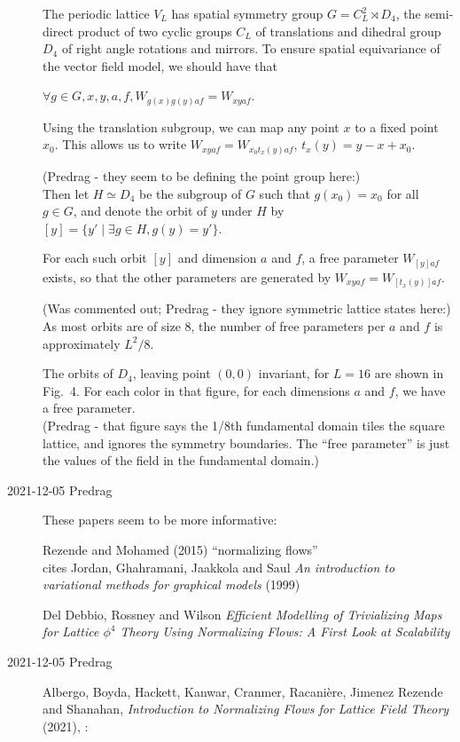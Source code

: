 \begin{description}
The periodic lattice $V_L$ has spatial symmetry group $G=C_L^2 \rtimes
D_4$, the semi-direct product of two cyclic groups $C_L$ of translations
and dihedral group $D_4$ of right angle rotations and mirrors.
To ensure spatial equivariance of the vector field model, we should have
that

$\forall g \in G, x,y,a, f, W_{g(x)g(y)af}=W_{xyaf}$.

Using the translation subgroup, we can map any point $x$ to a fixed point
$x_0$. This allows us to write $W_{xyaf}=W_{x_0t_x(y)af}$, $t_x(y) = y -
x + x_0$.

(Predrag - they seem to be defining the point group here:)\\
Then let $H\simeq D_4$ be the subgroup of $G$ such that $g(x_0)=x_0$ for
all $g\in G$, and denote the orbit of $y$ under $H$ by $[y]=\{y' \mid
\exists g \in H, g(y)=y'\}$.

For each such orbit $[y]$ and dimension $a$
and $f$, a free parameter $W_{[y]af}$ exists, so that the other
parameters are generated by $W_{xyaf}=W_{[t_x(y)]af}$.


(Was commented out; Predrag - they ignore symmetric lattice states here:)\\
As most orbits are of size 8, the number of free parameters per $a$ and
$f$ is approximately $L^2/8$.

The orbits of $D_4$, leaving point $(0, 0)$ invariant, for $L=16$ are
shown in Fig.~4. %
For each color in that figure, for each
dimensions $a$ and $f$, we have a free parameter.\\
(Predrag - that figure says the 1/8th fundamental domain tiles
the square lattice, and ignores the symmetry boundaries. The ``free parameter''
is just the values of the field in the fundamental domain.)


\item[2021-12-05 Predrag]
These papers seem to be more informative:

Rezende and Mohamed  (2015) ``normalizing flows''
\\
cites   Jordan,  Ghahramani,  Jaakkola  and Saul
{\em An introduction to variational methods for graphical models} (1999)

Del Debbio, Rossney and Wilson {\em Efficient Modelling of Trivializing
Maps for Lattice $\phi^4$ Theory Using Normalizing Flows: A First Look at
Scalability} 

\item[2021-12-05 Predrag]
Albergo, Boyda, Hackett, Kanwar, Cranmer, Racanière,
Jimenez Rezende and Shanahan, %
{\em Introduction to Normalizing Flows for Lattice Field Theory}
(2021),
:


\end{description}
